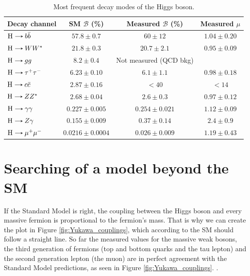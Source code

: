 \begin{table}[!ht]
    \centering
    \begin{tabular}{|l|c|c|c|}
        \hline
        \cellcolor{lightgray}Decay channel & \cellcolor{lightgray} SM $\mathcal{B}$ (\%) & \cellcolor{lightgray} Measured $\mathcal{B}$ (\%) & \cellcolor{lightgray} Measured $\mu$ \\ \hline
        $\text{H}\decaysto b\bar{b}$     & $57.8 \pm 0.7$        & $60 \pm 12$         & $1.04 \pm 0.20$ \cite{CMS:2018nsn}  \\
        $\text{H}\decaysto WW^*$         & $21.8 \pm 0.3$        & $20.7 \pm 2.1$      & $0.95 \pm 0.09$ \cite{CMS:2022uhn}  \\
        $\text{H}\decaysto gg$           & $8.2 \pm 0.4$         & Not measured (QCD bkg)    &   \\
        $\text{H}\decaysto \tau^+\tau^-$ & $6.23 \pm 0.10$       & $6.1 \pm 1.1$       & $0.98 \pm 0.18$ \cite{CMS:2017zyp}  \\
        $\text{H}\decaysto c\bar{c}$     & $2.87 \pm 0.16$       & $<40$               & $<14$ \cite{CMS:2022psv}            \\
        $\text{H}\decaysto ZZ^*$         & $2.68 \pm 0.04$       & $2.6 \pm 0.3$       & $0.97 \pm 0.12$ \cite{CMS:2022dwd}  \\
        $\text{H}\decaysto \gamma\gamma$ & $0.227 \pm 0.005$     & $0.254 \pm 0.021$   & $1.12 \pm 0.09$ \cite{CMS:2021kom}  \\
        $\text{H}\decaysto Z\gamma$      & $0.155 \pm 0.009$     & $0.37 \pm 0.14$     & $2.4 \pm 0.9$ \cite{CMS:2022ahq}    \\
        $\text{H}\decaysto \mu^+\mu^-$   & $0.0216 \pm 0.0004$   & $0.026 \pm 0.009$   & $1.19 \pm 0.43$ \cite{CMS:2020xwi}  \\ \hline
    \end{tabular}
    \caption{Most frequent decay modes of the Higgs boson.}
    \label{tab:Higgs_decays}
\end{table}

\section{Searching of a model beyond the SM}

If the Standard Model is right, the coupling between the Higgs boson and every massive fermion is proportional to the fermion's mass. That is why we can create the plot in Figure \ref{fig:Yukawa_couplings}, which according to the SM should follow a straight line. So far the measured values for the massive weak bosons, the third generation of fermions (top and bottom quarks and the tau lepton) and the second generation lepton (the muon) are in perfect agreement with the Standard Model predictions, as seen in Figure \ref{fig:Yukawa_couplings}. .

